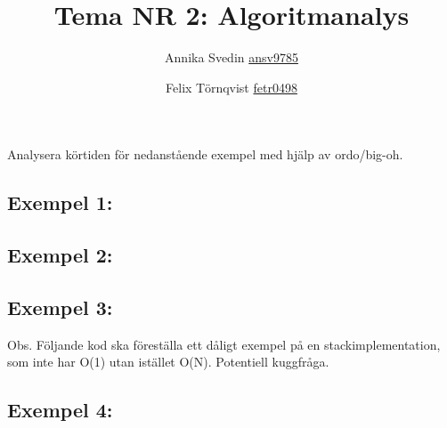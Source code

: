 \documentclass[a5paper,10pt,oneside]{article}
\title{Tema NR 2: Algoritmanalys}
\author{Annika Svedin \url{ansv9785} \and Felix Törnqvist \url{fetr0498}}
\begin{document}
\maketitle
\section*{}
Analysera körtiden för nedanstående exempel med hjälp av ordo/big-oh.

\subsection*{Exempel 1:}




\subsection*{Exempel 2:}



\subsection*{Exempel 3:}
Obs. 
Följande kod ska föreställa ett dåligt exempel på en stackimplementation, som inte har O(1) utan istället O(N). Potentiell kuggfråga.



\subsection*{Exempel 4:}

\end{document}
